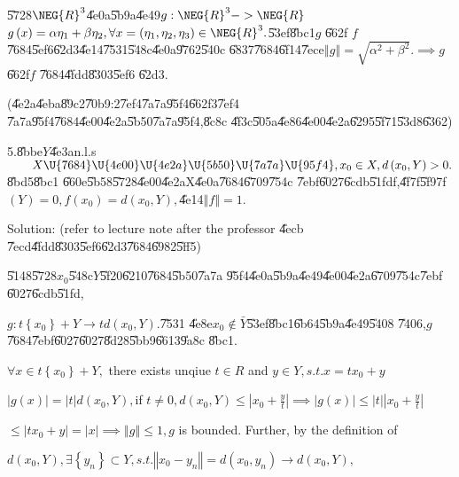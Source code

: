 \documentclass{article}
\begin{document}
\U{5728}$\NEG{R}^{3}$\U{4e0a}\U{5b9a}\U{4e49}$g:\NEG{R}^{3}->\NEG{R}$ $%
g\left( x\right) =\alpha \eta _{1}+\beta \eta _{2},\forall x=\left( \eta
_{1},\eta _{2},\eta _{3}\right) \in \NEG{R}^{3}.$\U{53ef}\U{8bc1}$g$ \U{662f}%
$f$\U{7684}\U{5ef6}\U{62d3}\U{4e14}\U{7531}\U{548c}\U{4e0a}\U{9762}\U{540c}%
\U{6837}\U{7684}\U{6f14}\U{7ece}$\left\Vert g\right\Vert =\sqrt{\alpha
^{2}+\beta ^{2}}.\implies g$ \U{662f}$f$ \U{7684}\U{4fdd}\U{8303}\U{5ef6}%
\U{62d3}.

(\U{4e2a}\U{4eba}\U{89c2}\U{70b9}:2\U{7ef4}\U{7a7a}\U{95f4}\U{662f}3\U{7ef4}%
\U{7a7a}\U{95f4}\U{7684}\U{4e00}\U{4e2a}\U{5b50}\U{7a7a}\U{95f4},\U{8c8c}%
\U{4f3c}\U{505a}\U{4e86}\U{4e00}\U{4e2a}\U{6295}\U{5f71}\U{53d8}\U{6362})

\bigskip

5.\U{8bbe}$Y$\U{4e3a}n.l.s$\qquad X\U{7684} \U{4e00} \U{4e2a} \U{5b50} 
\U{7a7a} \U{95f4} ,x_{0}\in X,d\left( x_{0},Y\right) >0.$\U{8bd5}\U{8bc1}%
\U{660e}\U{5b58}\U{5728}\U{4e00}\U{4e2a}X\U{4e0a}\U{7684}\U{6709}\U{754c}%
\U{7ebf}\U{6027}\U{6cdb}\U{51fd}f,\U{4f7f}\U{5f97}f$\left( Y\right)
=0,f\left( x_{0}\right) =d\left( x_{0},Y\right) ,$\U{4e14}$\left\Vert
f\right\Vert =1.$

\bigskip Solution: (refer to lecture note after the professor \U{4ecb}%
\U{7ecd}\U{4fdd}\U{8303}\U{5ef6}\U{62d3}\U{7684}\U{6982}\U{5ff5})

\U{5148}\U{5728}$x_{0}$\U{548c}$Y$\U{5f20}\U{6210}\U{7684}\U{5b50}\U{7a7a}%
\U{95f4}\U{4e0a}\U{5b9a}\U{4e49}\U{4e00}\U{4e2a}\U{6709}\U{754c}\U{7ebf}%
\U{6027}\U{6cdb}\U{51fd},

$g:t\left\{ x_{0}\right\} +Y\rightarrow td\left( x_{0},Y\right) .$\U{7531}%
\U{4e8e}$x_{0}\notin \bar{Y}$\U{53ef}\U{8bc1}\U{6b64}\U{5b9a}\U{4e49}\U{5408}%
\U{7406},$g$ \U{7684}\U{7ebf}\U{6027}\U{6027}\U{8d28}\U{5bb9}\U{6613}\U{9a8c}%
\U{8bc1}.

\bigskip $\forall x\in t\left\{ x_{0}\right\} +Y,$ there exists unqiue $t\in
R$ and $y\in Y,s.t.x=tx_{0}+y$

$\left\vert g\left( x\right) \right\vert =\left\vert t\right\vert d\left(
x_{0},Y\right) ,$if $t\neq 0,d\left( x_{0},Y\right) \leq \left\vert x_{0}+%
\frac{y}{t}\right\vert \implies \left\vert g\left( x\right) \right\vert \leq
\left\vert t\right\vert \left\vert x_{0}+\frac{y}{t}\right\vert $

$\leq \left\vert tx_{0}+y\right\vert =\left\vert x\right\vert \implies
\left\Vert g\right\Vert \leq 1,g$ is bounded. Further, by the definition of

$d\left( x_{0},Y\right) ,\exists \left\{ y_{n}\right\} \subset
Y,s.t.\left\Vert x_{0}-y_{n}\right\Vert =d\left( x_{0},y_{n}\right)
\rightarrow d\left( x_{0},Y\right) ,$
\end{document}
